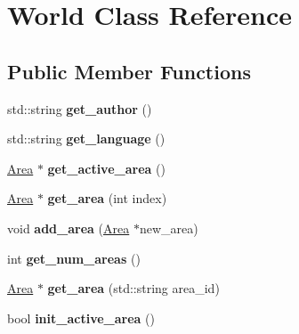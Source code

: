 \hypertarget{class_world}{
\section{World Class Reference}
\label{class_world}
}
\subsection*{Public Member Functions}
\begin{DoxyCompactItemize}
\item 
\hypertarget{class_world_a13598968c1b4061eb1529cdcb0755372}{
std::string {\bfseries get\_\-author} ()}
\label{class_world_a13598968c1b4061eb1529cdcb0755372}

\item 
\hypertarget{class_world_add6a887b9f085ec8d137b8f1f9e8de6c}{
std::string {\bfseries get\_\-language} ()}
\label{class_world_add6a887b9f085ec8d137b8f1f9e8de6c}

\item 
\hypertarget{class_world_ad78dca88aa1b004dc3f573a138c0c4fd}{
\hyperlink{class_area}{Area} $\ast$ {\bfseries get\_\-active\_\-area} ()}
\label{class_world_ad78dca88aa1b004dc3f573a138c0c4fd}

\item 
\hypertarget{class_world_a90483be2c68990b5dcff292bfe073522}{
\hyperlink{class_area}{Area} $\ast$ {\bfseries get\_\-area} (int index)}
\label{class_world_a90483be2c68990b5dcff292bfe073522}

\item 
\hypertarget{class_world_a64eb27a4ea7aaf9d36178e902676e8fe}{
void {\bfseries add\_\-area} (\hyperlink{class_area}{Area} $\ast$new\_\-area)}
\label{class_world_a64eb27a4ea7aaf9d36178e902676e8fe}

\item 
\hypertarget{class_world_a85cfec55f3135621a8a4a1f438f5cb93}{
int {\bfseries get\_\-num\_\-areas} ()}
\label{class_world_a85cfec55f3135621a8a4a1f438f5cb93}

\item 
\hypertarget{class_world_a8f80bc9bc42d754f531ce8ea4c4848f3}{
\hyperlink{class_area}{Area} $\ast$ {\bfseries get\_\-area} (std::string area\_\-id)}
\label{class_world_a8f80bc9bc42d754f531ce8ea4c4848f3}

\item 
\hypertarget{class_world_a8dadd0ff476194c1c6de68338d2012cf}{
bool {\bfseries init\_\-active\_\-area} ()}
\label{class_world_a8dadd0ff476194c1c6de68338d2012cf}


\end{DoxyCompactItemize}
